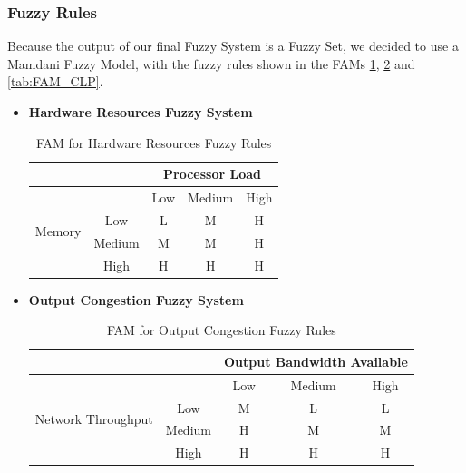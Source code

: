 \subsubsection{Fuzzy Rules}
Because the output of our final Fuzzy System is a Fuzzy Set, we decided to use a Mamdani Fuzzy Model, with the fuzzy rules shown in the FAMs \ref{tab:FAM_HDR}, \ref{tab:FAM_OUTC} and \ref{tab:FAM_CLP}.
\begin{itemize}
    \item \textbf{Hardware Resources Fuzzy System}
    \begin{table}[!htb]
        \begin{center}
            \begin{tabular}{ |c|c|c|c|c| }
                \hline
                & & \multicolumn{3}{c|}{Processor Load} \\
                \hline
                \multirow{4}{4em}{Memory} 
                &        & Low   & Medium & High \\ 
                & Low    & L     & M      & H \\ 
                & Medium & M     & M      & H \\ 
                & High   & H     & H      & H \\ 
                \hline
            \end{tabular}
            \caption{FAM for Hardware Resources Fuzzy Rules}
            \label{tab:FAM_HDR}
        \end{center}
    \end{table}
    
    \item \textbf{Output Congestion Fuzzy System}
    \begin{table}[!htb]
        \begin{center}
            \begin{tabular}{ |c|c|c|c|c| }
                \hline
                & & \multicolumn{3}{c|}{Output Bandwidth Available} \\
                \hline
                \multirow{4}{4em}{Network Throughput} 
                &        & Low   & Medium & High \\ 
                & Low    & M     & L      & L    \\ 
                & Medium & H     & M      & M    \\ 
                & High   & H     & H      & H    \\ 
                \hline
            \end{tabular}
            \caption{FAM for Output Congestion Fuzzy Rules}
            \label{tab:FAM_OUTC}
        \end{center}
    \end{table}
    

\end{itemize}
